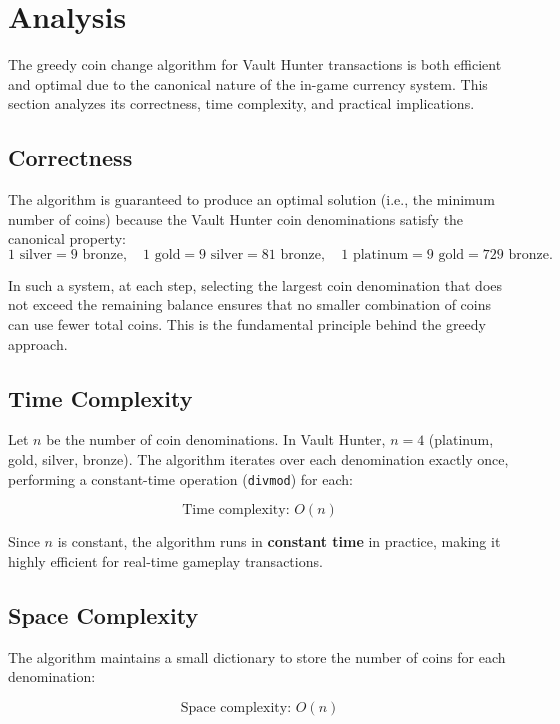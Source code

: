 \documentclass[12pt,a4paper]{report}
\begin{document}
\section{Analysis}

The greedy coin change algorithm for Vault Hunter transactions is both efficient and optimal due to the canonical nature of the in-game currency system. This section analyzes its correctness, time complexity, and practical implications.

\subsection{Correctness}

The algorithm is guaranteed to produce an optimal solution (i.e., the minimum number of coins) because the Vault Hunter coin denominations satisfy the canonical property:
\[
1 \text{ silver} = 9 \text{ bronze}, \quad
1 \text{ gold} = 9 \text{ silver} = 81 \text{ bronze}, \quad
1 \text{ platinum} = 9 \text{ gold} = 729 \text{ bronze}.
\]

\noindent In such a system, at each step, selecting the largest coin denomination that does not exceed the remaining balance ensures that no smaller combination of coins can use fewer total coins. This is the fundamental principle behind the greedy approach.

\subsection{Time Complexity}

Let $n$ be the number of coin denominations. In Vault Hunter, $n = 4$ (platinum, gold, silver, bronze). The algorithm iterates over each denomination exactly once, performing a constant-time operation (\texttt{divmod}) for each:

\[
\text{Time complexity: } O(n)
\]

Since $n$ is constant, the algorithm runs in \textbf{constant time} in practice, making it highly efficient for real-time gameplay transactions.

\subsection{Space Complexity}

The algorithm maintains a small dictionary to store the number of coins for each denomination:

\[
\text{Space complexity: } O(n)
\]
\end{document}
